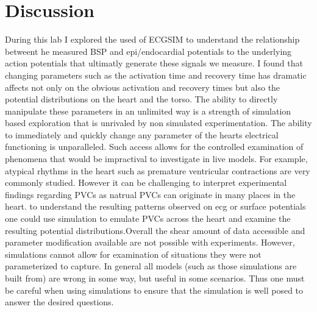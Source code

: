 \documentclass[12pt]{article}
\begin{document}
\section{Discussion}
During this lab I explored the used of ECGSIM to understand the relationship betweent he measured BSP and epi/endocardial potentials to the underlying action potentials that ultimatly generate these signals we measure. I found that changing parameters such as the activation time and recovery time has dramatic affects not only on the obvious activation and recovery times but also the potential distributions on the heart and the torso. The ability to directly manipulate these parameters in an unlimited way is a strength of simulation based exploration that is unrivaled by non simulated experimentation. The ability to immediately and quickly change any parameter of the hearts electrical functioning is unparalleled. Such access allows for the controlled examination of phenomena that would be impractival to investigate in live models. For example, atypical rhythms in the heart such as premature ventricular contractions are very commonly studied. However it can be challenging to interpret experimental findings regarding PVCs as natrual PVCs can originate in many places in the heart. to understand the resulting patterns observed on ecg or surface potentials one could use simulation to emulate PVCs across the heart and examine the resulting potential distributions.Overall the shear amount of data accessible and parameter modification available are not possible with experiments. However, simulations cannot allow for examination of situations they were not parameterized to capture. In general all models (such as those simulations are built from) are wrong in some way, but useful in some scenarios. Thus one must be careful when using simulations to ensure that the simulation is well posed to answer the desired questions. 

%
%
\end{document}
